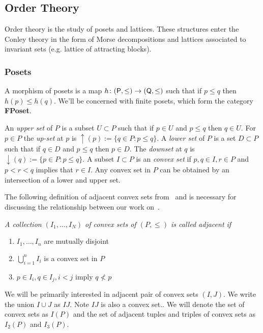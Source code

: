 \subsection{Order Theory}\label{sec:prelims:order}

Order theory is the study of posets and lattices.  These structures enter the Conley theory in the form of Morse decompositions and lattices associated to invariant sets (e.g. lattice of attracting blocks). %


\subsubsection{Posets}

A morphism of posets is a map $h\colon({\mathsf P},\leq)\to ({\mathsf Q},\leq)$ such that if $p\leq q$ then $h(p)\leq h(q)$.  We'll be concerned with finite posets, which form the category {\bf FPoset}.

 An {\em upper set} of $P$ is a subset $U\subset P$ such that if $p\in U$ and $p\leq q$ then $q\in U$.  For $p\in P$ the {\em up-set} at $p$ is $\uparrow(p):=\{q\in P:p \leq q\}$.  A {\em lower set} of $P$ is a set $D\subset P$ such that if $q\in D$ and $p\leq q$ then $p\in D$.  The {\em downset} at $q$ is $\downarrow(q):=\{p\in P: p \leq q\}$.  A subset $I\subset P$ is an {\em convex set} if $p,q\in I, r\in P$ and $ p < r < q$ implies that $r\in I$.  Any convex set in $P$ can be obtained by an intersection of a lower and upper set.  
 
 
 The following definition of adjacent convex sets from~\cite{fran} and is necessary for discussing the relationship between our work on~\cite{fran}.
\begin{defn}
{\em
A collection $(I_1,\ldots, I_N)$ of convex sets of $(P,\leq)$ is called {\em adjacent} if
\begin{enumerate}
\item $I_1,\ldots,I_n$ are mutually disjoint
\item $\bigcup_{i=1}^n I_i$ is a convex set in $P$
\item $p\in I_i, q\in I_j, i < j$ imply $q \nless p$
\end{enumerate}
}
\end{defn}

We will be primarily interested in adjacent pair of convex sets $(I,J)$.  We write the union $I\cup J$ as $IJ$.  Note $IJ$ is also a convex set..  We will denote the set of convex sets as $I(P)$ and the set of adjacent tuples and triples of convex sets as $I_2(P)$ and $I_3(P)$.  
%
%



